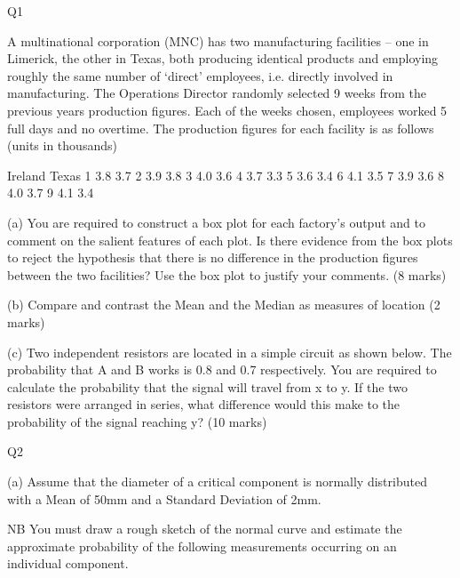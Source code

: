 




















Q1

A multinational corporation (MNC) has two manufacturing facilities – one in Limerick, the other in Texas, both producing identical products and employing roughly the same number of ‘direct’ employees, i.e. directly involved in manufacturing.  The Operations Director randomly selected 9 weeks from the previous years production figures.  Each of the weeks chosen, employees worked 5 full days and no overtime.  The production figures for each facility is as follows (units in thousands)


	Ireland	Texas
1	3.8	3.7
2	3.9	3.8
3	4.0	3.6
4	3.7	3.3
5	3.6	3.4
6	4.1	3.5
7	3.9	3.6
8	4.0	3.7
9	4.1	3.4


(a)	You are required to construct a box plot for each factory’s output and to comment on the salient features of each plot.  Is there evidence from the box plots to reject the hypothesis that there is no difference in the production figures between the two facilities?  Use the box plot to justify your comments. 							(8 marks)

(b)	Compare and contrast the Mean and the Median as measures of location
(2 marks)

(c)	Two independent resistors are located in a simple circuit as shown below.  The probability that A and B works is 0.8 and 0.7 respectively.  You are required to calculate the probability that the signal will travel from x to y.  If the two resistors were arranged in series, what difference would this make to the probability of the signal reaching y?
(10 marks)











 
Q2


(a)	Assume that the diameter of a critical component is normally distributed with a Mean of 50mm and a Standard Deviation of 2mm.

NB 	You must draw a rough sketch of the normal curve and estimate the approximate probability of the following measurements occurring on an individual component. 
 
